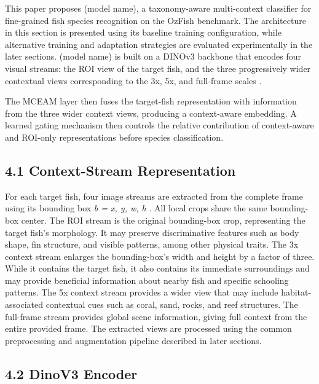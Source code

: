 \documentclass[preprint,12pt]{elsarticle}
\providecommand{\RL}[1]{#1}
\begin{document}
This paper proposes (model name), a taxonomy-aware multi-context
classifier for fine-grained fish species recognition on the OzFish
benchmark. The architecture in this section is presented using its
baseline training configuration, while alternative training and
adaptation strategies are evaluated experimentally in the later
sections. (model name) is built on a DINOv3 backbone
\cite{ref25} that encodes four visual streams:
the ROI view of the target fish, and the three progressively wider
contextual views corresponding to the 3x, 5x, and full-frame scales
\cite{ref26}.

The MCEAM layer \cite{ref26} then fuses the
target-fish representation with information from the three wider context
views, producing a context-aware embedding. A learned gating mechanism
then controls the relative contribution of context-aware and ROI-only
representations before species classification.

\subsection*{4.1 Context-Stream
Representation}\label{context-stream-representation}

For each target fish, four image streams are extracted from the complete
frame using its bounding box \emph{b = x, y, w, h}
\cite{ref26}. All local crops share the same
bounding-box center. The ROI stream is the original bounding-box crop,
representing the target fish's morphology. It may preserve
discriminative features such as body shape, fin structure, and visible
patterns, among other physical traits. The 3x context stream enlarges
the bounding-box's width and height by a factor of three. While it
contains the target fish, it also contains its immediate surroundings
and may provide beneficial information about nearby fish and specific
schooling patterns. The 5x context stream provides a wider view that may
include habitat-associated contextual cues such as coral, sand, rocks,
and reef structures. The full-frame stream provides global scene
information, giving full context from the entire provided frame. The
extracted views are processed using the common preprocessing and
augmentation pipeline described in later sections.\RL{}

\subsection*{4.2 DinoV3 Encoder}\label{dinov3-encoder}
\end{document}
